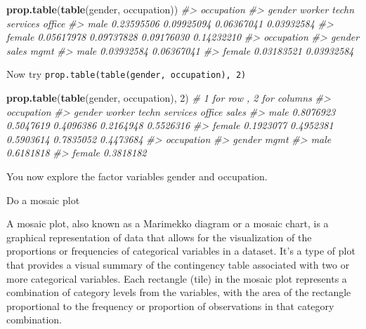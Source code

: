\documentclass[
]{book}
\newenvironment{Shaded}{\begin{snugshade}}{\end{snugshade}}
\newcommand{\CommentTok}[1]{\textcolor[rgb]{0.56,0.35,0.01}{\textit{#1}}}
\newcommand{\DecValTok}[1]{\textcolor[rgb]{0.00,0.00,0.81}{#1}}
\newcommand{\FunctionTok}[1]{\textcolor[rgb]{0.13,0.29,0.53}{\textbf{#1}}}
\newcommand{\NormalTok}[1]{#1}
\begin{document}
\begin{Shaded}
\begin{Highlighting}[]
\FunctionTok{prop.table}\NormalTok{(}\FunctionTok{table}\NormalTok{(gender, occupation))}
\CommentTok{\#\textgreater{}         occupation}
\CommentTok{\#\textgreater{} gender       worker      techn   services     office}
\CommentTok{\#\textgreater{}   male   0.23595506 0.09925094 0.06367041 0.03932584}
\CommentTok{\#\textgreater{}   female 0.05617978 0.09737828 0.09176030 0.14232210}
\CommentTok{\#\textgreater{}         occupation}
\CommentTok{\#\textgreater{} gender        sales       mgmt}
\CommentTok{\#\textgreater{}   male   0.03932584 0.06367041}
\CommentTok{\#\textgreater{}   female 0.03183521 0.03932584}
\end{Highlighting}
\end{Shaded}

Now try \texttt{prop.table(table(gender,\ occupation),\ 2)}

\begin{Shaded}
\begin{Highlighting}[]
\FunctionTok{prop.table}\NormalTok{(}\FunctionTok{table}\NormalTok{(gender, occupation), }\DecValTok{2}\NormalTok{) }\CommentTok{\# 1 for row , 2 for columns}
\CommentTok{\#\textgreater{}         occupation}
\CommentTok{\#\textgreater{} gender      worker     techn  services    office     sales}
\CommentTok{\#\textgreater{}   male   0.8076923 0.5047619 0.4096386 0.2164948 0.5526316}
\CommentTok{\#\textgreater{}   female 0.1923077 0.4952381 0.5903614 0.7835052 0.4473684}
\CommentTok{\#\textgreater{}         occupation}
\CommentTok{\#\textgreater{} gender        mgmt}
\CommentTok{\#\textgreater{}   male   0.6181818}
\CommentTok{\#\textgreater{}   female 0.3818182}
\end{Highlighting}
\end{Shaded}

You now explore the factor variables gender and occupation.

Do a mosaic plot

A mosaic plot, also known as a Marimekko diagram or a mosaic chart, is a graphical representation of data that allows for the visualization of the proportions or frequencies of categorical variables in a dataset. It's a type of plot that provides a visual summary of the contingency table associated with two or more categorical variables. Each rectangle (tile) in the mosaic plot represents a combination of category levels from the variables, with the area of the rectangle proportional to the frequency or proportion of observations in that category combination.
\end{document}
